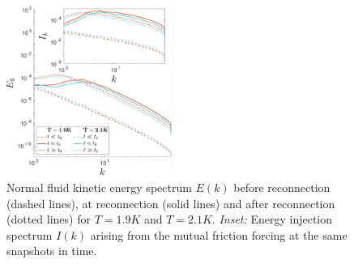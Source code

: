 \documentclass[%
 reprint,
 amsmath,amssymb,
 aps,
 prl,
]{revtex4-2}
\begin{document}
{\begin{figure}[b]
    \centering
    \includegraphics*[width=0.48\textwidth]{energy-spec.pdf}
    \caption{Normal fluid kinetic energy spectrum $E(k)$ before reconnection (dashed lines), at reconnection (solid lines) and after reconnection (dotted lines) for $T=1.9K$ and $T=2.1K$. \emph{Inset:} Energy injection spectrum $I(k)$ arising from the mutual friction forcing at the same snapshots in time.}
    \label{fig:kinetic-energy}
\end{figure}

}
\end{document}
